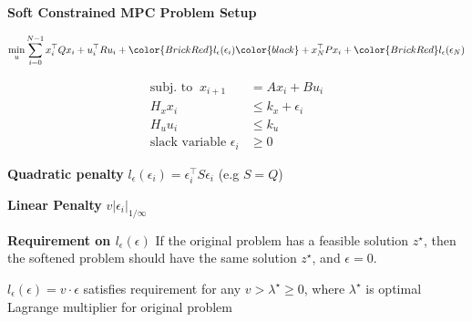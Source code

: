 \begin{sstTitleBox}[ForestGreen]{\center\textbf{\large
			Soft Constrained MPC Problem Setup
		}
	}


	\begin{adjustbox}{rndcorners=0.5mm}
		\begin{sstOnlyFrame}[ForestGreen]
			\[
				\min_u\sum_{i=0}^{N-1}
				x_i^\top Q x_i + u_i^\top R u_i
				+\color{BrickRed}l_\epsilon(\epsilon_i)\color{black}
				+x_N^\top P x_i
				+\color{BrickRed}l_\epsilon(\epsilon_N)
			\]
		\end{sstOnlyFrame}
	\end{adjustbox}
	\[\begin{aligned}
			\text{subj.\ to }\   x_{i+1}      & = Ax_i + Bu_i      \\
			H_xx_i                            & \le k_x+\epsilon_i \\
			H_uu_i                            & \le k_u            \\
			\text{slack variable }	\epsilon_i & \ge0
		\end{aligned}\]

\end{sstTitleBox}

\textbf{Quadratic penalty}
$l_\epsilon(\epsilon_i) =
	\epsilon_i^\top S \epsilon_i$ (e.g $S = Q$)

\textbf{Linear Penalty}
$v|\epsilon_i|_{1/\infty}$


\textbf{Requirement on $l_\epsilon(\epsilon)$}
If the original problem has a feasible solution $z^\star$,
then the softened problem should have the same solution $z^\star$,
and $\epsilon = 0$.

\begin{theorem}
	$l_\epsilon(\epsilon) = v \cdot \epsilon$ satisfies requirement for any $v > \lambda^\star \geq 0$,
	where $\lambda^\star$ is optimal Lagrange multiplier for original problem
\end{theorem}


